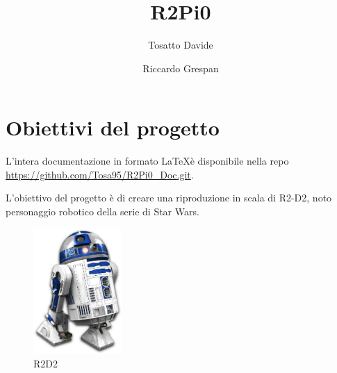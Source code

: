 \documentclass[12pt]{article}
\title{R2Pi0}
\author{
  Tosatto Davide
  \and
  Riccardo Grespan
}
\newcommand{\imgsz}{0.3\textwidth}
\begin{document}
 


\maketitle
\newpage
\tableofcontents
\newpage
\section{Obiettivi del progetto}

\begin{minipage}{\linewidth}
L'intera documentazione in formato \LaTeX è disponibile nella repo \url{https://github.com/Tosa95/R2Pi0_Doc.git}.
\end{minipage}

\bigskip

L'obiettivo del progetto è di creare una riproduzione in scala di R2-D2, noto personaggio robotico della serie di Star Wars.

\begin{figure}[h]
\includegraphics[width=\imgsz]{R2D2}
\centering
\caption{R2D2}
\label{fig:R2D2}
\end{figure}
\end{document}
